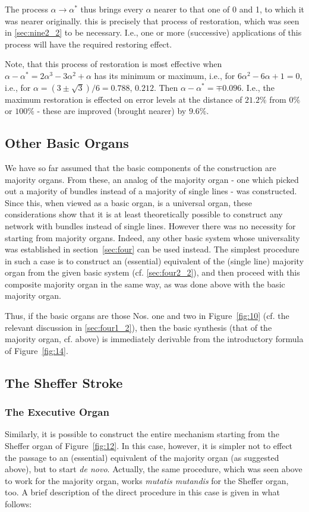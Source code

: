 \documentclass[twocolumn,preprintnumbers,amsmath,amssymb,floatfix]{revtex4}
\begin{document}
The process $\alpha\rightarrow\alpha^*$ thus brings every $\alpha$
nearer to that one of 0 and 1, to which it was nearer originally.
this is precisely that process of restoration, which was seen in
\ref{sec:nine2_2} to be necessary. I.e., one or more (successive)
applications of this process will have the required restoring
effect.

Note, that this process of restoration is most effective when
$\alpha-\alpha^*=2\alpha^3-3\alpha^2+\alpha$ has its minimum or
maximum, i.e., for $6\alpha^2-6\alpha+1=0$, i.e., for
$\alpha=(3\pm\sqrt{3})/6=0.788$, $0.212$. Then
$\alpha-\alpha^*=\mp 0.096$. I.e., the maximum restoration is
effected on error levels at the distance of $21.2\%$ from $0\%$ or
$100\%$ - these are improved (brought nearer) by $9.6\%$.

\subsection{\label{sec:nine3}Other Basic Organs}

We have so far assumed that the basic components of the
construction are majority organs. From these, an analog of the
majority organ - one which picked out a majority of bundles
instead of a majority of single lines - was constructed. Since
this, when viewed as a basic organ, is a universal organ, these
considerations show that it is at least theoretically possible to
construct any network with bundles instead of single lines.
However there was no necessity for starting from majority organs.
Indeed, any other basic system whose universality was established
in section~\ref{sec:four} can be used instead. The simplest
procedure in such a case is to construct an (essential) equivalent
of the (single line) majority organ from the given basic system
(cf. \ref{sec:four2_2}), and then proceed with this composite
majority organ in the same way, as was done above with the basic
majority organ.

Thus, if the basic organs are those Nos. one and two in
Figure~\ref{fig:10} (cf. the relevant discussion in
\ref{sec:four1_2}), then the basic synthesis (that of the majority
organ, cf. above) is immediately derivable from the introductory
formula of Figure~\ref{fig:14}.

\subsection{\label{sec:nine4}The Sheffer Stroke}

\subsubsection{\label{sec:nine4_1}The Executive Organ} Similarly,
it is possible to construct the entire mechanism starting from the
Sheffer organ of Figure~\ref{fig:12}. In this case, however, it is
simpler not to effect the passage to an (essential) equivalent of
the majority organ (as suggested above), but to start \textit{de
novo}. Actually, the same procedure, which was seen above to work
for the majority organ, works \textit{mutatis mutandis} for the
Sheffer organ, too. A brief description of the direct procedure in
this case is given in what follows:
\end{document}
